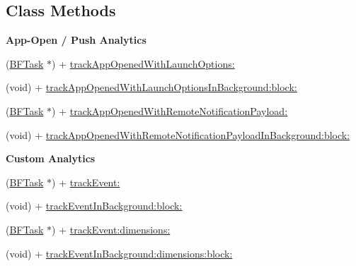 \subsection*{Class Methods}
\begin{Indent}{\bf App-\/\+Open / Push Analytics}\par
{\em 

 

 }\begin{DoxyCompactItemize}
\item 
(\hyperlink{interface_b_f_task}{B\+F\+Task} $\ast$) + \hyperlink{interface_p_f_analytics_a6ef303c214aea9acb9be0c95dcfc21c8}{track\+App\+Opened\+With\+Launch\+Options\+:}
\item 
(void) + \hyperlink{interface_p_f_analytics_adcb8651a55a0860addb9154fed50ccb1}{track\+App\+Opened\+With\+Launch\+Options\+In\+Background\+:block\+:}
\item 
(\hyperlink{interface_b_f_task}{B\+F\+Task} $\ast$) + \hyperlink{interface_p_f_analytics_a9b59fb69ce3cbb808860f0118d801c17}{track\+App\+Opened\+With\+Remote\+Notification\+Payload\+:}
\item 
(void) + \hyperlink{interface_p_f_analytics_ad2c7b6ddd5eb097016058d91a762e227}{track\+App\+Opened\+With\+Remote\+Notification\+Payload\+In\+Background\+:block\+:}
\end{DoxyCompactItemize}
\end{Indent}
\begin{Indent}{\bf Custom Analytics}\par
{\em 

 

 }\begin{DoxyCompactItemize}
\item 
(\hyperlink{interface_b_f_task}{B\+F\+Task} $\ast$) + \hyperlink{interface_p_f_analytics_adb5aff5fa1ec04d9afe8a72158140c2a}{track\+Event\+:}
\item 
(void) + \hyperlink{interface_p_f_analytics_ad9cdc0a4c76878ea38851f09a9c50733}{track\+Event\+In\+Background\+:block\+:}
\item 
(\hyperlink{interface_b_f_task}{B\+F\+Task} $\ast$) + \hyperlink{interface_p_f_analytics_a9b4b20642864e92d7810091388ee1949}{track\+Event\+:dimensions\+:}
\item 
(void) + \hyperlink{interface_p_f_analytics_a431e4beca03db128f9600c473606edcd}{track\+Event\+In\+Background\+:dimensions\+:block\+:}
\end{DoxyCompactItemize}
\end{Indent}


